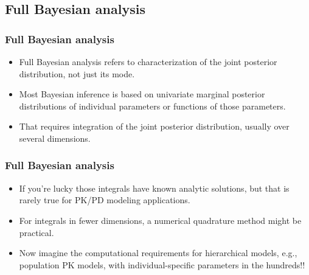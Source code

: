 \documentclass{beamer}
\begin{document}





\subsection{Full Bayesian analysis}

\begin{frame}
  \frametitle{Full Bayesian analysis}

  \begin{itemize}
\item<1-> Full Bayesian analysis refers to characterization of the joint
posterior distribution, not just its mode.
\item<2-> Most Bayesian inference is based on univariate marginal
  posterior distributions of individual parameters or functions of
 those parameters.
\item<3-> That requires integration of the joint posterior distribution,
  usually over several dimensions.
  \end{itemize}

\end{frame}

\begin{frame}
  \frametitle{Full Bayesian analysis}

  \begin{itemize}
  \item<1-> If you're lucky those integrals have known analytic solutions,
    but that is rarely true for PK/PD modeling applications.
  \item<2-> For integrals in fewer dimensions, a numerical
    quadrature method might be practical. 
  \item<3-> Now imagine the computational requirements for hierarchical
    models, e.g., population PK models, with individual-specific
    parameters in the hundreds!!
  \end{itemize}

\end{frame}
\end{document}
